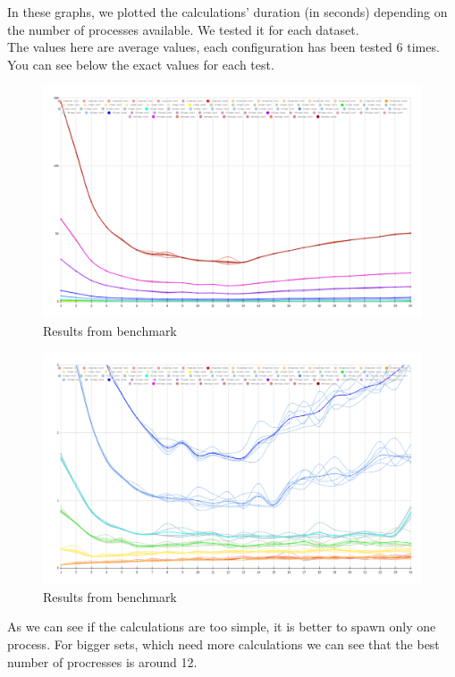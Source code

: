 In these graphs, we plotted the calculations' duration (in seconds) depending on the number of processes available. We tested it for each dataset.\\
The values here are average values, each configuration has been tested 6 times.\\
You can see below the exact values for each test.

\begin{figure}[H]
    \centering
    \includegraphics[width=18cm]{images/perfsAll.png}
    \caption{Results from benchmark}
    \label{fig:benchmarkRes}
\end{figure}
\begin{figure}[H]
    \centering
    \includegraphics[width=18cm]{images/perfsAllZoomed.png}
    \caption{Results from benchmark}
    \label{fig:benchmarkResZoomed}
\end{figure}
As we can see if the calculations are too simple, it is better to spawn only one process.
For bigger sets, which need more calculations we can see that the best number of procresses is around 12.

